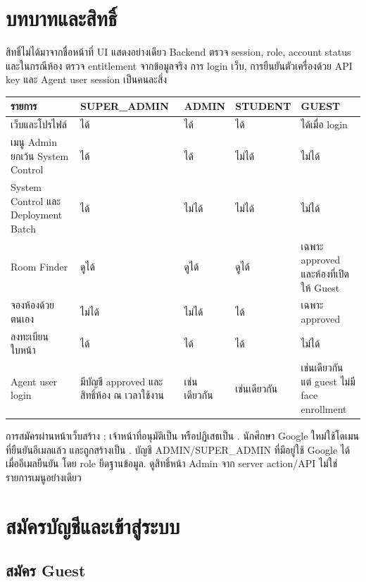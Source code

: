 \chapter{บทบาทและสิทธิ์}
สิทธิ์ไม่ได้มาจากชื่อหน้าที่ UI แสดงอย่างเดียว Backend ตรวจ session, role, account status และในกรณีห้อง ตรวจ entitlement จากข้อมูลจริง การ login เว็บ, การยืนยันตัวเครื่องด้วย API key และ Agent user session เป็นคนละสิ่ง
\begin{longtable}{L{34mm}L{31mm}L{31mm}L{31mm}L{31mm}}
\toprule รายการ & SUPER\_ADMIN & ADMIN & STUDENT & GUEST \\ \midrule\endhead
เว็บและโปรไฟล์ & ได้ & ได้ & ได้ & ได้เมื่อ login \\
เมนู Admin ยกเว้น System Control & ได้ & ได้ & ไม่ได้ & ไม่ได้ \\
System Control และ Deployment Batch & ได้ & ไม่ได้ & ไม่ได้ & ไม่ได้ \\
Room Finder & ดูได้ & ดูได้ & ดูได้ & เฉพาะ approved และห้องที่เปิดให้ Guest \\
จองห้องด้วยตนเอง & ไม่ได้ & ไม่ได้ & ได้ & เฉพาะ approved \\
ลงทะเบียนใบหน้า & ได้ & ได้ & ได้ & ไม่ได้ \\
Agent user login & มีบัญชี approved และสิทธิ์ห้อง ณ เวลาใช้งาน & เช่นเดียวกัน & เช่นเดียวกัน & เช่นเดียวกัน แต่ guest ไม่มี face enrollment \\
\bottomrule
\end{longtable}
การสมัครผ่านหน้าเว็บสร้าง ; เจ้าหน้าที่อนุมัติเป็น  หรือปฏิเสธเป็น . นักศึกษา Google ใหม่ใช้โดเมน  ที่ยืนยันอีเมลแล้ว และถูกสร้างเป็น . บัญชี ADMIN/SUPER\_ADMIN ที่มีอยู่ใช้ Google ได้เมื่ออีเมลยืนยัน โดย role ยึดฐานข้อมูล. ดูสิทธิ์หน้า Admin จาก server action/API ไม่ใช่รายการเมนูอย่างเดียว

\chapter{สมัครบัญชีและเข้าสู่ระบบ}
\section*{สมัคร Guest}
\begin{enumerate}
\end{enumerate}
